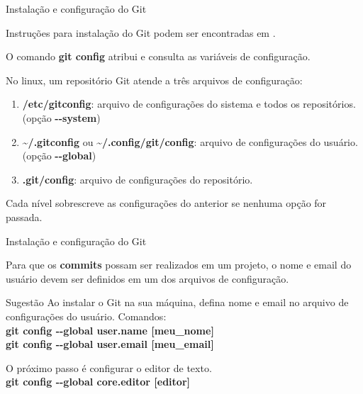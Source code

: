 \documentclass[a4paper]{beamer}
\begin{document}
\begin{frame}{Instalação e configuração do Git}

Instruções para instalação do Git podem ser encontradas em \cite{proGit}.
\pause

\vspace{10pt}
O comando \textbf{git config} atribui e consulta as variáveis de configuração.

\vspace{10pt}
No linux, um repositório Git atende a três arquivos de configuração:
\begin{enumerate}[<+->]
\item \textbf{/etc/gitconfig}: arquivo de configurações do sistema e todos os repositórios. (opção \textbf{-{}-system})
\item \textbf{\textasciitilde /.gitconfig} ou \textbf{\textasciitilde /.config/git/config}: arquivo de configurações do usuário. (opção \textbf{-{}-global})
\item \textbf{.git/config}: arquivo de configurações do repositório.
\end{enumerate}

\vspace{10pt}
Cada nível sobrescreve as configurações do anterior se nenhuma opção for passada.

\end{frame}

\begin{frame}{Instalação e configuração do Git}

Para que os \textbf{commits} possam ser realizados em um projeto, o nome e email do usuário devem ser definidos em um dos arquivos de configuração.

\begin{block}{Sugestão}
Ao instalar o Git na sua máquina, defina nome e email no arquivo de configurações do usuário. Comandos:\\
\textbf{git config -{}-global user.name [meu\_nome]}\\
\textbf{git config -{}-global user.email [meu\_email]}
\end{block}
\pause

\vspace{10pt}
O próximo passo é configurar o editor de texto.\\
\textbf{git config -{}-global core.editor [editor]}

\end{frame}
\end{document}
